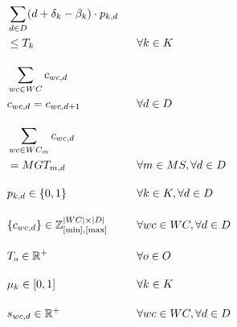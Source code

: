\documentclass[runningheads]{llncs}
\begin{document}
\begin{alignat}{2}
    &\sum_{d \in D} (d + \delta_k - \beta_k) \cdot p_{k,d}                                      \ \ && \notag \\
    &\leq  T_k                                                                                  \ \ && \forall k \in K                              \label{eqn:tactical_tardiness} \\[1em]
    &\sum_{wc \in WC} c_{wc,d}                                                                  \ \ && \notag \\
    &c_{wc,d} = c_{wc,d+1}                                                                      \ \ && \forall d \in D                              \label{eqn:tactical_consistent_crew} \\[1em]
    &\sum_{wc \in WC_{m}} c_{wc,d}                                                              \ \ && \notag \\
    & = MGT_{m,d}                                                                               \ \ && \forall m \in MS, \forall d \in D            \label{eqn:tactical_multiskill} \\[1em]
    &p_{k,d} \in \{0,1\}                                                                        \ \ && \forall k \in K, \forall d \in D             \label{eqn:tactical_pattern_variable} \\[1em]
    &\{c_{wc,d}\} \in \mathbb{Z}^{|WC| \times |D|}_{[\text{min}], [\text{max}]}                 \ \ && \forall wc \in WC, \forall d \in D           \label{eqn:tactical_crew_variable} \\[1em]
    &T_o \in \mathbb{R}^{+}                                                                     \ \ && \forall o \in O                              \label{eqn:tactical_tardiness_variable} \\[1em]
    &\mu_k \in [0,1]                                                                            \ \ && \forall k \in K                              \label{eqn:tactical_finish_start_difference} \\[1em]
    &s_{wc,d} \in \mathbb{R}^{+}                                                                \ \ && \forall wc \in WC, \forall d \in D           \label{eqn:tactical_excess_capacity_variable}  
\end{alignat}

\end{document}
